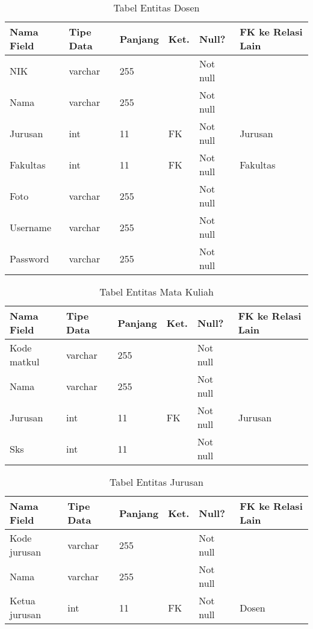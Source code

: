 \begin{table}[H]
\centering
\caption{Tabel Entitas Dosen}
\label{entitas_dosen}
\begin{tabular}{|l|l|l|l|l|l|}
\hline
\textbf{Nama Field}&\textbf{Tipe Data}&\textbf{Panjang}&\textbf{Ket.}&\textbf{Null?}&\textbf{FK ke Relasi Lain}\\ \hline
NIK&varchar&255&&Not null&\\ \hline
Nama&varchar&255&&Not null&\\ \hline
Jurusan&int&11&FK&Not null&Jurusan\\ \hline
Fakultas&int&11&FK&Not null&Fakultas\\ \hline
Foto&varchar&255&&Not null&\\ \hline
Username&varchar&255&&Not null&\\ \hline
Password&varchar&255&&Not null&\\ \hline
\end{tabular}
\end{table}

\begin{table}[H]
\centering
\caption{Tabel Entitas Mata Kuliah}
\label{entitas_mata_kuliah}
\begin{tabular}{|l|l|l|l|l|l|}
\hline
\textbf{Nama Field}&\textbf{Tipe Data}&\textbf{Panjang}&\textbf{Ket.}&\textbf{Null?}&\textbf{FK ke Relasi Lain}\\ \hline
Kode matkul&varchar&255&&Not null&\\ \hline
Nama&varchar&255&&Not null&\\ \hline
Jurusan&int&11&FK&Not null&Jurusan\\ \hline
Sks&int&11&&Not null&\\ \hline
\end{tabular}
\end{table}

\begin{table}[H]
\centering
\caption{Tabel Entitas Jurusan}
\label{entitas_jurusan}
\begin{tabular}{|l|l|l|l|l|l|}
\hline
\textbf{Nama Field}&\textbf{Tipe Data}&\textbf{Panjang}&\textbf{Ket.}&\textbf{Null?}&\textbf{FK ke Relasi Lain}\\ \hline
Kode jurusan&varchar&255&&Not null&\\ \hline
Nama&varchar&255&&Not null&\\ \hline
Ketua jurusan&int&11&FK&Not null&Dosen\\ \hline
\end{tabular}
\end{table}

